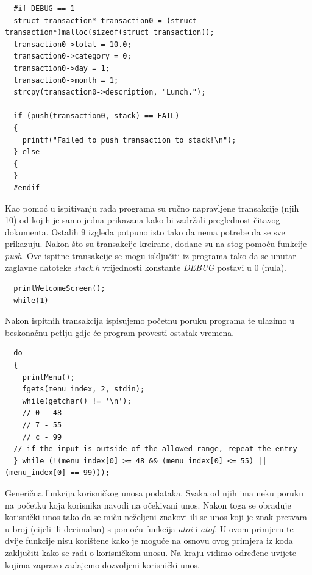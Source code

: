 \documentclass[12pt, letterpaper]{article}
\begin{document}
  \begin{verbatim}
  #if DEBUG == 1
  struct transaction* transaction0 = (struct transaction*)malloc(sizeof(struct transaction));
  transaction0->total = 10.0;
  transaction0->category = 0;
  transaction0->day = 1;
  transaction0->month = 1;
  strcpy(transaction0->description, "Lunch.");

  if (push(transaction0, stack) == FAIL)
  {
    printf("Failed to push transaction to stack!\n");
  } else
  {
  }
  #endif
  \end{verbatim}
  Kao pomoć u ispitivanju rada programa su ručno napravljene transakcije (njih 10) od kojih je samo jedna prikazana kako bi zadržali preglednost čitavog dokumenta. Ostalih 9 izgleda potpuno isto tako da nema potrebe da se sve prikazuju. Nakon što su transakcije kreirane, dodane su na stog pomoću funkcije \textit{push}. Ove ispitne transakcije se mogu isključiti iz programa tako da se unutar zaglavne datoteke \textit{stack.h} vrijednosti konstante \textit{DEBUG} postavi u 0 (nula).

  \begin{verbatim}
  printWelcomeScreen();
  while(1)
  \end{verbatim}
  Nakon ispitnih transakcija ispisujemo početnu poruku programa te ulazimo u beskonačnu petlju gdje će program provesti ostatak vremena.
  \begin{verbatim}
  do
  {
    printMenu();
    fgets(menu_index, 2, stdin);
    while(getchar() != '\n');
    // 0 - 48
    // 7 - 55
    // c - 99
  // if the input is outside of the allowed range, repeat the entry
  } while (!(menu_index[0] >= 48 && (menu_index[0] <= 55) || (menu_index[0] == 99)));
  \end{verbatim}
  Generična funkcija korisničkog unosa podataka. Svaka od njih ima neku poruku na početku koja korisnika navodi na očekivani unos. Nakon toga se obrađuje korisnički unos tako da se miču neželjeni znakovi ili se unos koji je znak pretvara u broj (cijeli ili decimalan) s pomoću funkcija \textit{atoi} i \textit{atof}. U ovom primjeru te dvije funkcije nisu korištene kako je moguće na osnovu ovog primjera iz koda zaključiti kako se radi o korisničkom unosu. Na kraju vidimo određene uvijete kojima zapravo zadajemo dozvoljeni korisnički unos.
  
\end{document}
